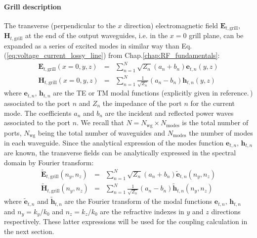 
\paragraph{Grill description}
The transverse (perpendicular to the $x$ direction) electromagnetic field $\mathbf{E}_{t,\mbox{grill}}$, $\mathbf{H}_{t,\mbox{grill}}$ at the end of the output waveguides, i.e. in the $x=0$ grill plane, can be expanded as a series of excited modes in similar way than Eq.(\ref{eq:voltage_current_lossy_line}) from Chap.\ref{chap:RF_fundamentals}:
\begin{eqnarray}
\mathbf{E}_{t,\mbox{grill}}(x=0,y,z) & = & \sum_{n=1}^{N}\sqrt{Z_{n}}\left(a_{n}+b_{n}\right)\mathbf{e}_{t,n}(y,z)\\
\mathbf{H}_{t,\mbox{grill}}(x=0,y,z) & = & \sum_{n=1}^{N}\frac{1}{\sqrt{Z_{n}}}\left(a_{n}-b_{n}\right)\mathbf{h}_{t,n}(y,z)
\end{eqnarray}
where $\mathbf{e}_{t,n},\,\mathbf{h}_{t,n}$ are the TE or TM modal functions (explicitly given in reference.\,\cite{Harrington2001}) associated to the port $n$ and $Z_{n}$ the impedance of the port $n$ for the current mode. The coefficients $a_{n}$ and $b_{n}$ are the incident and reflected power waves associated to the port $n$. We recall that $N=N_{\mbox{wg}}\times N_{\mbox{modes}}$ is the total number of ports, $N_{\mbox{wg}}$ being the total number of waveguides and $N_{\mbox{modes}}$ the number of modes in each waveguide. Since the analytical expression of the modes function $\mathbf{e}_{t,n},\,\mathbf{h}_{t,n}$ are known, the transverse fields can be analytically expressed in the spectral domain by Fourier transform:
\begin{eqnarray}
\tilde{\mathbf{E}}_{t,\mbox{grill}}\left(n_{y},n_{z}\right) & = & \sum_{n=1}^{N}\sqrt{Z_{n}}\left(a_{n}+b_{n}\right)\tilde{\mathbf{e}}_{t,n}\left(n_{y},n_{z}\right)\label{eq:E_grill_spectral}\\
\tilde{\mathbf{H}}_{t,\mbox{grill}}\left(n_{y},n_{z}\right) & = & \sum_{n=1}^{N}\frac{1}{\sqrt{Z_{n}}}\left(a_{n}-b_{n}\right)\tilde{\mathbf{h}}_{t,n}\left(n_{y},n_{z}\right)\label{eq:H_grill_spectral}\end{eqnarray}
where $\tilde{\mathbf{e}}_{t,n}$ and $\tilde{\mathbf{h}}_{t,n}$ are the Fourier transform of the modal functions $\mathbf{e}_{t,n},\,\mathbf{h}_{t,n}$ and $n_{y}=k_{y}/k_{0}$ and $n_{z}=k_{z}/k_{0}$ are the refractive indexes in $y$ and $z$ directions respectively. These latter expressions will be used for the coupling calculation in the next section.


